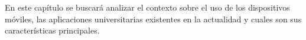 
En este capítulo se buscará analizar el contexto sobre el uso de los dispositivos móviles, las aplicaciones universitarias existentes en la actualidad y cuales son sus características principales.